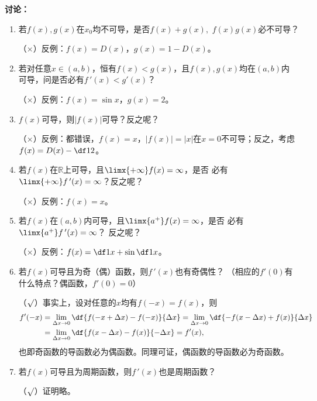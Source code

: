 {\bf 讨论：}
\begin{enumerate}[(1)]
  \setlength{\itemindent}{1cm}
  \item 若$f(x),g(x)$在$x_0$均不可导，是否$f(x)+g(x),$ $f(x)g(x)$必不可导？
  
  \ifhint\quad （{$\times$}）反例：$f(x)=D(x)$，$g(x)=1-D(x)$。\fi
  \item 若对任意$x\in (a,b)$，恒有$f(x)<g(x)$，且$f(x),g(x)$均在$(a,b)$内
  可导，问是否必有$f\,'(x)<g'(x)$？ 
  
  \ifhint\quad（{$\times$}）反例：$f(x)=\sin x$，$g(x)=2$。 \fi
  \item $f(x)$可导，则$|f(x)|$可导？反之呢？
  
  \ifhint\quad（{$\times$}）反例：都错误，$f(x)=x$，$|f(x)|=|x|$在$x=0$不可导；反之，考虑$f(x)=D(x)-\df12$。\fi
  \item 若$f(x)$在$\mathbb{R}$上可导，且$\limx{+\infty}f(x)=\infty$，是否
  必有$\limx{+\infty}f\,'(x)=\infty$？反之呢？ 
  
  \ifhint\quad（{$\times$}）反例：$f(x)=x$。\fi
  \item 若$f(x)$在$(a,b)$内可导，且$\limx{a^+}f(x)=\infty$，是否
  必有$\limx{a^+}f\,'(x)=\infty$？ 反之呢？
  
  \ifhint\quad（{$\times$}）反例：$f(x)=\df1x+\sin\df1x$。 \fi
  \item 若$f(x)$可导且为奇（偶）函数，则$f\,'(x)$也有奇偶性？ 
  （相应的$f'(0)$有什么特点？偶函数，$f'(0)=0$）

  \ifhint\quad（{$\surd$}）事实上，设对任意的$x$均有$f(-x)=f(x)$，则
  \begin{align*}
  	f'(-x)&
  =\lim\limits_{\Delta x\to 0}\df{f(-x+\Delta x)-f(-x)}{\Delta x}
  =\lim\limits_{\Delta x\to 0}\df{-f(x-\Delta x)+f(x)}{\Delta x}\\
  &=\lim\limits_{\Delta x\to 0}\df{f(x-\Delta x)-f(x)}{-\Delta x}
  =f'(x),
  \end{align*}
  也即奇函数的导函数必为偶函数。同理可证，偶函数的导函数必为奇函数。
  \fi
  \item 若$f(x)$可导且为周期函数，则$f\,'(x)$也是周期函数？ 

  \ifhint\quad（{$\surd$}）证明略。
  \fi
\end{enumerate}

% 

